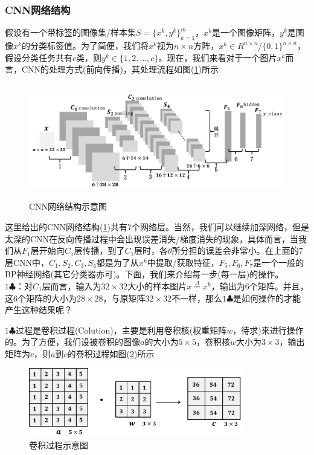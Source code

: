         \subsubsection{CNN网络结构}
            \par
            假设有一个带标签的图像集/样本集$S = \{x^k,y^k\}_{k=1}^m$，$x^k$是一个图像矩阵，$y^k$是图像$x^k$的分类标签值。为了简便，我们将$x^k$视为$n\times n$方阵，$x^k\in R^{n\times n}/\{0,1\}^{n\times n}$，假设分类任务共有$c$类，则$y^k\in \{1,2,\dots,c\}$。现在，我们来看对于一个图片$x^k$而言，CNN的处理方式(前向传播)，其处理流程如图(\ref{fig:CNN网络结构示意图})所示
            \begin{figure}[H]
            \centering
            \includegraphics[height=5cm]{images/CNN_net_structure.jpg}
            \caption{CNN网络结构示意图}
            \label{fig:CNN网络结构示意图}
            \end{figure}
            \par
            这里给出的CNN网络结构(\ref{fig:CNN网络结构示意图})共有7个网络层。当然，我们可以继续加深网络，但是太深的CNN在反向传播过程中会出现误差消失/梯度消失的现象，具体而言，当我们从$F_1$层开始向$C_1$层传播，到了$C_1$层时，各$\theta$所分担的误差会非常小。在上面的7层CNN中，$C_1,S_2,C_3,S_4$都是为了从$x^k$中提取/获取特征，$F_5,F_6,F_7$是一个一般的BP神经网络(其它分类器亦可)。下面，我们来介绍每一步(每一层)的操作。\\
            $1\clubsuit$：对$C_1$层而言，输入为$32\times 32$大小的样本图片$x \overset{\Delta}{=}x^k$，输出为$6$个矩阵。并且，这6个矩阵的大小为$28\times 28$，与原矩阵$32\times 32$不一样，那么$1\clubsuit$是如何操作的才能产生这种结果呢？
            \par
            $1\clubsuit$过程是卷积过程(Colution)，主要是利用卷积核(权重矩阵$w$，待求)来进行操作的。为了方便，我们设被卷积的图像$a$的大小为$5\times 5$，卷积核$w$大小为$3\times 3$，输出矩阵为$c$，则$a$到$c$的卷积过程如图(\ref{fig:卷积过程示意图})所示
            \begin{figure}[H]
            \centering
            \includegraphics[height=3cm]{images/Colution.jpg}
            \caption{卷积过程示意图}
            \label{fig:卷积过程示意图}
            \end{figure}
